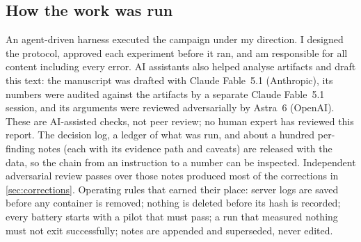 \subsection{How the work was run}
An agent-driven harness executed the campaign under my direction. I designed the protocol, approved
each experiment before it ran, and am responsible for all content including every error. AI
assistants also helped analyse artifacts and draft this text: the manuscript was drafted with Claude
Fable~5.1 (Anthropic), its numbers were audited against the artifacts by a separate Claude Fable~5.1
session, and its arguments were reviewed adversarially by Astra~6 (OpenAI). These are AI-assisted
checks, not peer review; no human expert has reviewed this report. The decision log, a ledger of what was
run, and about a hundred per-finding notes (each with its evidence path and caveats) are released with
the data, so the chain from an instruction to a number can be inspected. Independent adversarial
review passes over those notes produced most of the corrections in \cref{sec:corrections}.
Operating rules that earned their place: server logs are saved before any container is removed;
nothing is deleted before its hash is recorded; every battery starts with a pilot that must pass; a
run that measured nothing must not exit successfully; notes are appended and superseded, never edited.
